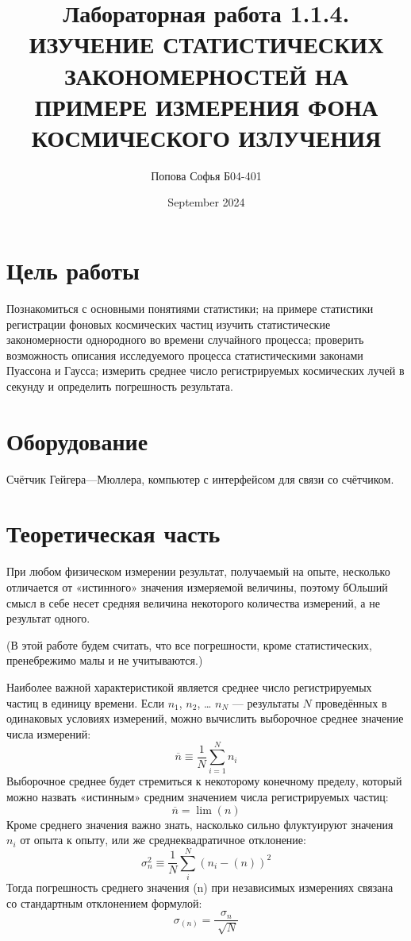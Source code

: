 \documentclass{article}
\title{\textbf{Лабораторная работа 1.1.4.} \linebreak
ИЗУЧЕНИЕ СТАТИСТИЧЕСКИХ ЗАКОНОМЕРНОСТЕЙ НА
ПРИМЕРЕ ИЗМЕРЕНИЯ ФОНА КОСМИЧЕСКОГО ИЗЛУЧЕНИЯ}
\author{Попова Софья Б04-401}
\date{September 2024}
\begin{document}
\maketitle

\section*{Цель работы}
Познакомиться с основными понятиями статистики; на примере статистики регистрации фоновых космических частиц изучить статистические закономерности однородного во времени случайного процесса; проверить возможность описания исследуемого процесса статистическими законами Пуассона и Гаусса; измерить среднее число регистрируемых космических лучей в секунду и определить
погрешность результата.

\section*{Оборудование}
Счётчик Гейгера—Мюллера, компьютер с интерфейсом
для связи со счётчиком.

\section*{Теоретическая часть}
При любом физическом измерении результат, получаемый на опыте, несколько отличается от «истинного» значения измеряемой величины, поэтому бОльший смысл в себе несет средняя величина некоторого количества измерений, а не результат одного.

\noindent
(В этой работе будем считать, что все погрешности, кроме статистических, пренебрежимо малы и не учитываются.)

\noindent
Наиболее важной характеристикой является среднее число регистрируемых частиц в единицу времени. Если $n_1$, $n_2$, … $n_N$ — результаты $N$ проведённых в одинаковых условиях измерений, можно вычислить выборочное среднее значение числа измерений:
\begin{equation}\label{нср}
\overline{n}\equiv\frac{1}{N}\sum_{i=1}^{N} {n_i}
\end{equation} 
Выборочное среднее будет стремиться к некоторому конечному пределу, который
можно назвать «истинным» средним значением числа регистрируемых частиц:
\begin{equation}\label{нср}
\overline{n}=\lim{(n)}
\end{equation} 
Кроме среднего значения важно знать, насколько сильно флуктуируют
значения $n_i$ от опыта к опыту, или же среднеквадратичное отклонение:
\begin{equation}\label{нср}
\sigma^2_n\equiv\frac{1}{N}{\sum_{i}^{N} {(n_i-(n))^2}}
\end{equation}
Тогда погрешность среднего значения (n) при независимых измерениях связана со стандартным отклонением формулой:
\begin{equation}\label{нср}
\sigma_{(n)}=\frac{\sigma_{n}}{\sqrt[]{N}}
\end{equation}
\end{document}
